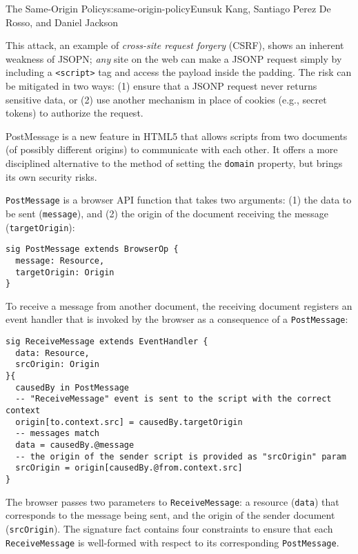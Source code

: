 \begin{aosachapter}{The Same-Origin Policy}{s:same-origin-policy}{Eunsuk Kang, Santiago Perez De Rosso, and Daniel Jackson}

This attack, an example of \emph{cross-site request forgery} (CSRF),
shows an inherent weakness of JSOPN; \emph{any} site on the web can make
a JSONP request simply by including a
\texttt{\textless{}script\textgreater{}} tag and access the payload
inside the padding. The risk can be mitigated in two ways: (1) ensure
that a JSONP request never returns sensitive data, or (2) use another
mechanism in place of cookies (e.g., secret tokens) to authorize the
request.

\label{postmessage}

PostMessage is a new feature in HTML5 that allows scripts from two
documents (of possibly different origins) to communicate with each
other. It offers a more disciplined alternative to the method of setting
the \texttt{domain} property, but brings its own security risks.

\texttt{PostMessage} is a browser API function that takes two arguments:
(1) the data to be sent (\texttt{message}), and (2) the origin of the
document receiving the message (\texttt{targetOrigin}):

\begin{verbatim}
sig PostMessage extends BrowserOp {
  message: Resource,
  targetOrigin: Origin
}
\end{verbatim}

To receive a message from another document, the receiving document
registers an event handler that is invoked by the browser as a
consequence of a \texttt{PostMessage}:

\begin{verbatim}
sig ReceiveMessage extends EventHandler {
  data: Resource,
  srcOrigin: Origin
}{
  causedBy in PostMessage
  -- "ReceiveMessage" event is sent to the script with the correct context
  origin[to.context.src] = causedBy.targetOrigin
  -- messages match
  data = causedBy.@message
  -- the origin of the sender script is provided as "srcOrigin" param 
  srcOrigin = origin[causedBy.@from.context.src]
}
\end{verbatim}

The browser passes two parameters to \texttt{ReceiveMessage}: a resource
(\texttt{data}) that corresponds to the message being sent, and the
origin of the sender document (\texttt{srcOrigin}). The signature fact
contains four constraints to ensure that each \texttt{ReceiveMessage} is
well-formed with respect to its corresponding \texttt{PostMessage}.


\end{aosachapter}

